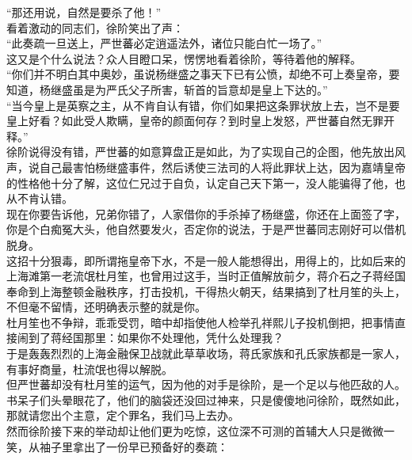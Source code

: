 \begin{multicols}{\theparacolNo}
“那还用说，自然是要杀了他！”\\

看着激动的同志们，徐阶笑出了声：\\

“此奏疏一旦送上，严世蕃必定逍遥法外，诸位只能白忙一场了。”\\

这又是个什么说法？众人目瞪口呆，愣愣地看着徐阶，等待着他的解释。\\

“你们并不明白其中奥妙，虽说杨继盛之事天下已有公愤，却绝不可上奏皇帝，要知道，杨继盛虽是为严氏父子所害，斩首的旨意却是皇上下达的。”\\

“当今皇上是英察之主，从不肯自认有错，你们如果把这条罪状放上去，岂不是要皇上好看？如此受人欺瞒，皇帝的颜面何存？到时皇上发怒，严世蕃自然无罪开释。”\\

徐阶说得没有错，严世蕃的如意算盘正是如此，为了实现自己的企图，他先放出风声，说自己最害怕杨继盛事件，然后诱使三法司的人将此罪状上达，因为嘉靖皇帝的性格他十分了解，这位仁兄过于自负，认定自己天下第一，没人能骗得了他，也从不肯认错。\\

现在你要告诉他，兄弟你错了，人家借你的手杀掉了杨继盛，你还在上面签了字，你是个白痴冤大头，他自然要发火，否定你的说法，于是严世蕃同志刚好可以借机脱身。\\

这招十分狠毒，即所谓拖皇帝下水，不是一般人能想得出，用得上的，比如后来的上海滩第一老流氓杜月笙，也曾用过这手，当时正值解放前夕，蒋介石之子蒋经国奉命到上海整顿金融秩序，打击投机，干得热火朝天，结果搞到了杜月笙的头上，不但毫不留情，还明确表示整的就是你。\\

杜月笙也不争辩，乖乖受罚，暗中却指使他人检举孔祥熙儿子投机倒把，把事情直接闹到了蒋经国那里：如果你不处理他，凭什么处理我？\\

于是轰轰烈烈的上海金融保卫战就此草草收场，蒋氏家族和孔氏家族都是一家人，有事好商量，杜流氓也得以解脱。\\

但严世蕃却没有杜月笙的运气，因为他的对手是徐阶，是一个足以与他匹敌的人。\\

书呆子们头晕眼花了，他们的脑袋还没回过神来，只是傻傻地问徐阶，既然如此，那就请您出个主意，定个罪名，我们马上去办。\\

然而徐阶接下来的举动却让他们更为吃惊，这位深不可测的首辅大人只是微微一笑，从袖子里拿出了一份早已预备好的奏疏：\\


\end{multicols}
